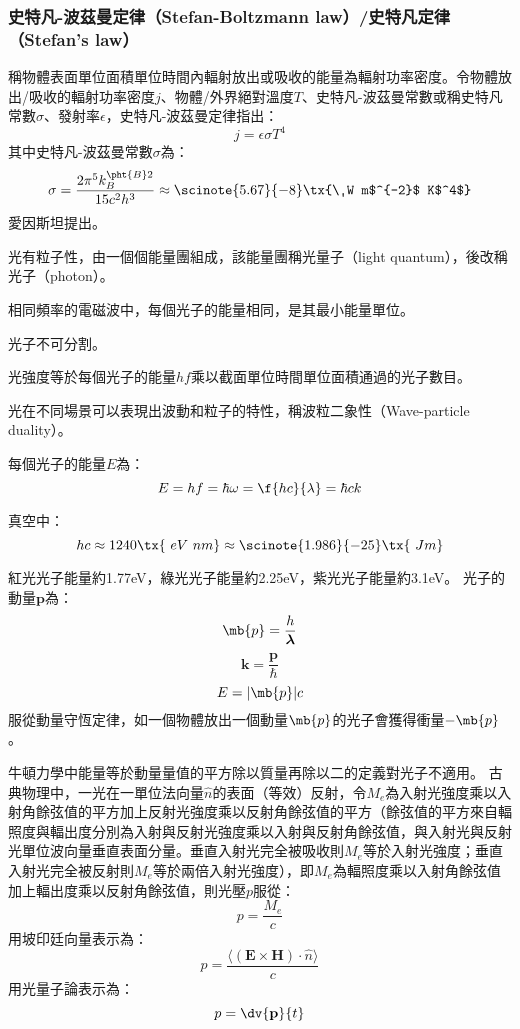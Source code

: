 \documentclass[a4paper,12pt]{article}
\begin{document}
\subsubsection{史特凡-波茲曼定律（Stefan-Boltzmann law）/史特凡定律（Stefan's law）}
稱物體表面單位面積單位時間內輻射放出或吸收的能量為輻射功率密度。令物體放出/吸收的輻射功率密度$j$、物體/外界絕對溫度$T$、史特凡-波茲曼常數或稱史特凡常數$\sigma$、發射率$\epsilon$，史特凡-波茲曼定律指出：
\[j=\epsilon\sigma T^4\]
其中史特凡-波茲曼常數$\sigma$為：
\[\sigma=\frac{2\pi^5k_B^{\pht{B}2}}{15c^2h^3}\approx\scinote{5.67}{-8}\tx{\ W m$^{-2}$ K$^4$}\]
愛因斯坦提出。
\bit
\item 光有粒子性，由一個個能量團組成，該能量團稱光量子（light quantum），後改稱光子（photon）。
\item 相同頻率的電磁波中，每個光子的能量相同，是其最小能量單位。
\item 光子不可分割。
\item 光強度等於每個光子的能量$hf$乘以截面單位時間單位面積通過的光子數目。
\item 光在不同場景可以表現出波動和粒子的特性，稱波粒二象性（Wave-particle duality）。
\item 每個光子的能量$E$為：
\[E=hf=\hbar\omega=\f{hc}{\lambda}=\hbar ck\]
\eit

真空中：
\[hc\approx 1240\tx{\ eV\ nm}\approx\scinote{1.986}{-25}\tx{\ J m}\]

紅光光子能量約1.77eV，綠光光子能量約2.25eV，紫光光子能量約3.1eV。
光子的動量$\mathbf{p}$為：
\[\mb{p}=\frac{h}{\boldsymbol{\lambda}}\]
\[\mathbf{k}=\frac{\mathbf{p}}{\hbar}\]
\[E=|\mb{p}|c\]
服從動量守恆定律，如一個物體放出一個動量$\mb{p}$的光子會獲得衝量$-\mb{p}$。

牛頓力學中能量等於動量量值的平方除以質量再除以二的定義對光子不適用。
古典物理中，一光在一單位法向量$\hat{n}$的表面（等效）反射，令$M_e$為入射光強度乘以入射角餘弦值的平方加上反射光強度乘以反射角餘弦值的平方（餘弦值的平方來自輻照度與輻出度分別為入射與反射光強度乘以入射與反射角餘弦值，與入射光與反射光單位波向量垂直表面分量。垂直入射光完全被吸收則$M_e$等於入射光強度；垂直入射光完全被反射則$M_e$等於兩倍入射光強度），即$M_e$為輻照度乘以入射角餘弦值加上輻出度乘以反射角餘弦值，則光壓$p$服從：
\[p=\frac{M_e}{c}\]
用坡印廷向量表示為：
\[p=\frac{\langle(\mathbf{E}\times\mathbf{H})\cdot\hat{n}\rangle}{c}\]
用光量子論表示為：
\[p=\dv{\mathbf{p}}{t}\]
\end{document}
